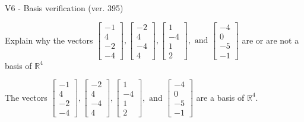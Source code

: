 \begin{exercise}
  \begin{exerciseTitle}V6 - Basis verification (ver. 395)\end{exerciseTitle}
  \begin{exerciseStatement}
    Explain why the vectors \(\left[\begin{array}{r}
-1 \\
4 \\
-2 \\
-4
\end{array}\right] , \left[\begin{array}{r}
-2 \\
4 \\
-4 \\
4
\end{array}\right] , \left[\begin{array}{r}
1 \\
-4 \\
1 \\
2
\end{array}\right] , \text{ and } \left[\begin{array}{r}
-4 \\
0 \\
-5 \\
-1
\end{array}\right]\) are or are not a basis of \(\mathbb{R}^4\)	


  \end{exerciseStatement}
  \begin{exerciseAnswer}
   The vectors \(\left[\begin{array}{r}
-1 \\
4 \\
-2 \\
-4
\end{array}\right] , \left[\begin{array}{r}
-2 \\
4 \\
-4 \\
4
\end{array}\right] , \left[\begin{array}{r}
1 \\
-4 \\
1 \\
2
\end{array}\right] , \text{ and } \left[\begin{array}{r}
-4 \\
0 \\
-5 \\
-1
\end{array}\right]\) 
  	 are  a basis of \(\mathbb{R}^4\).
  


  \end{exerciseAnswer}
\end{exercise}
